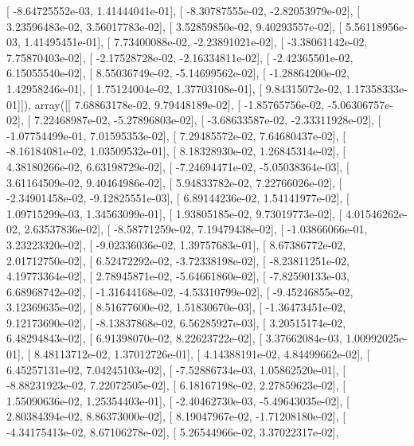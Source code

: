 \documentclass{article}
\begin{document}
       [ -8.64725552e-03,   1.41444041e-01],
       [ -8.30787555e-02,  -2.82053979e-02],
       [  3.23596483e-02,   3.56017783e-02],
       [  3.52859850e-02,   9.40293557e-02],
       [  5.56118956e-03,   1.41495451e-01],
       [  7.73400088e-02,  -2.23891021e-02],
       [ -3.38061142e-02,   7.75870403e-02],
       [ -2.17528728e-02,  -2.16334811e-02],
       [ -2.42365501e-02,   6.15055540e-02],
       [  8.55036749e-02,  -5.14699562e-02],
       [ -1.28864200e-02,   1.42958246e-01],
       [  1.75124004e-02,   1.37703108e-01],
       [  9.84315072e-02,   1.17358333e-01]]), array([[  7.68863178e-02,   9.79448189e-02],
       [ -1.85765756e-02,  -5.06306757e-02],
       [  7.22468987e-02,  -5.27896803e-02],
       [ -3.68633587e-02,  -2.33311928e-02],
       [ -1.07754499e-01,   7.01595353e-02],
       [  7.29485572e-02,   7.64680437e-02],
       [ -8.16184081e-02,   1.03509532e-01],
       [  8.18328930e-02,   1.26845314e-02],
       [  4.38180266e-02,   6.63198729e-02],
       [ -7.24694471e-02,  -5.05038364e-03],
       [  3.61164509e-02,   9.40464986e-02],
       [  5.94833782e-02,   7.22766026e-02],
       [ -2.34901458e-02,  -9.12825551e-03],
       [  6.89144236e-02,   1.54141977e-02],
       [  1.09715299e-03,   1.34563099e-01],
       [  1.93805185e-02,   9.73019773e-02],
       [  4.01546262e-02,   2.63537836e-02],
       [ -8.58771259e-02,   7.19479438e-02],
       [ -1.03866066e-01,   3.23223320e-02],
       [ -9.02336036e-02,   1.39757683e-01],
       [  8.67386772e-02,   2.01712750e-02],
       [  6.52472292e-02,  -3.72338198e-02],
       [ -8.23811251e-02,   4.19773364e-02],
       [  2.78945871e-02,  -5.64661860e-02],
       [ -7.82590133e-03,   6.68968742e-02],
       [ -1.31644168e-02,  -4.53310799e-02],
       [ -9.45246855e-02,   3.12369635e-02],
       [  8.51677600e-02,   1.51830670e-03],
       [ -1.36473451e-02,   9.12173690e-02],
       [ -8.13837868e-02,   6.56285927e-03],
       [  3.20515174e-02,   6.48294843e-02],
       [  6.91398070e-02,   8.22623722e-02],
       [  3.37662084e-03,   1.00992025e-01],
       [  8.48113712e-02,   1.37012726e-01],
       [  4.14388191e-02,   4.84499662e-02],
       [  6.45257131e-02,   7.04245103e-02],
       [ -7.52886734e-03,   1.05862520e-01],
       [ -8.88231923e-02,   7.22072505e-02],
       [  6.18167198e-02,   2.27859623e-02],
       [  1.55090636e-02,   1.25354403e-01],
       [ -2.40462730e-03,  -5.49643035e-02],
       [  2.80384394e-02,   8.86373000e-02],
       [  8.19047967e-02,  -1.71208180e-02],
       [ -4.34175413e-02,   8.67106278e-02],
       [  5.26544966e-02,   3.37022317e-02],
\end{document}
